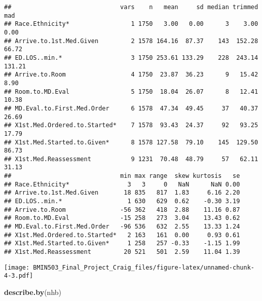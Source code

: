 \documentclass[]{article}
\newenvironment{Shaded}{\begin{snugshade}}{\end{snugshade}}
\newcommand{\KeywordTok}[1]{\textcolor[rgb]{0.13,0.29,0.53}{\textbf{#1}}}
\newcommand{\OperatorTok}[1]{\textcolor[rgb]{0.81,0.36,0.00}{\textbf{#1}}}
\newcommand{\NormalTok}[1]{#1}
\begin{document}
\begin{verbatim}
##                              vars    n   mean     sd median trimmed    mad
## Race.Ethnicity*                 1 1750   3.00   0.00      3    3.00   0.00
## Arrive.to.1st.Med.Given         2 1578 164.16  87.37    143  152.28  66.72
## ED.LOS..min.*                   3 1750 253.61 133.29    228  243.14 131.21
## Arrive.to.Room                  4 1750  23.87  36.23      9   15.42   8.90
## Room.to.MD.Eval                 5 1750  18.04  26.07      8   12.41  10.38
## MD.Eval.to.First.Med.Order      6 1578  47.34  49.45     37   40.37  26.69
## X1st.Med.Ordered.to.Started*    7 1578  93.43  24.37     92   93.25  17.79
## X1st.Med.Started.to.Given*      8 1578 127.58  79.10    145  129.50  86.73
## X1st.Med.Reassessment           9 1231  70.48  48.79     57   62.11  31.13
##                              min max range  skew kurtosis   se
## Race.Ethnicity*                3   3     0   NaN      NaN 0.00
## Arrive.to.1st.Med.Given       18 835   817  1.83     6.16 2.20
## ED.LOS..min.*                  1 630   629  0.62    -0.30 3.19
## Arrive.to.Room               -56 362   418  2.88    11.16 0.87
## Room.to.MD.Eval              -15 258   273  3.04    13.43 0.62
## MD.Eval.to.First.Med.Order   -96 536   632  2.55    13.33 1.24
## X1st.Med.Ordered.to.Started*   2 163   161  0.00     0.93 0.61
## X1st.Med.Started.to.Given*     1 258   257 -0.33    -1.15 1.99
## X1st.Med.Reassessment         20 521   501  2.59    11.04 1.39
\end{verbatim}

\begin{Shaded}
\end{Shaded}

\texttt{[image: BMIN503\_Final\_Project\_Craig\_files/figure-latex/unnamed-chunk-4-3.pdf]}

\begin{Shaded}
\begin{Highlighting}[]
\KeywordTok{describe.by}\NormalTok{(nhb)}
\end{Highlighting}
\end{Shaded}
\end{document}
